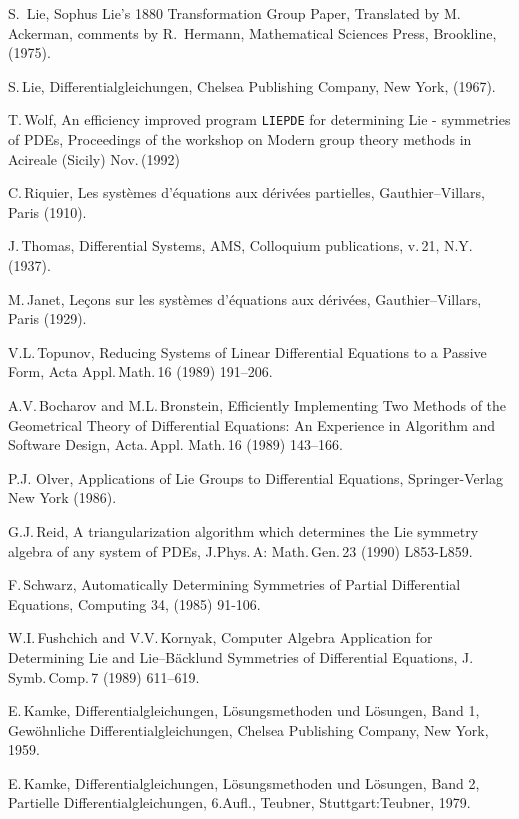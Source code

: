 \begin{thebibliography}{999}
 S.\, Lie, Sophus Lie's 1880 Transformation Group Paper,
Translated by M.\, Ackerman, comments by R.\, Hermann, Mathematical Sciences 
Press, Brookline, (1975).

 S.\,Lie, Differentialgleichungen, Chelsea Publishing Company,
New York, (1967).

 T.\,Wolf, An efficiency improved program \texttt{LIEPDE}
for determining Lie - symmetries of PDEs, Proceedings of the workshop on
Modern group theory methods in Acireale (Sicily) Nov.\,(1992)

 C.\,Riquier, Les syst\`{e}mes d'\'{e}quations 
aux d\'{e}riv\'{e}es partielles, Gauthier--Villars, Paris (1910).

 J.\,Thomas, Differential Systems, AMS, Colloquium
publications, v.\,21, N.Y.\,(1937).

 M.\,Janet, Le\c{c}ons sur les syst\`{e}mes d'\'{e}quations aux
d\'{e}riv\'{e}es, Gauthier--Villars, Paris (1929).

 V.L.\,Topunov, Reducing Systems of Linear Differential
Equations to a Passive Form, Acta Appl.\,Math.\,16 (1989) 191--206.

 A.V.\,Bocharov and M.L.\,Bronstein, Efficiently
Implementing Two Methods of the Geometrical Theory of Differential
Equations: An Experience in Algorithm and Software Design, Acta.\,Appl.
Math.\,16 (1989) 143--166.

 P.J. Olver, Applications of Lie Groups to Differential
Equations, Springer-Verlag New York (1986).

 G.J.\,Reid, A triangularization algorithm which
determines the Lie symmetry algebra of any system of PDEs, J.Phys.\,A:
Math.\,Gen.\,23 (1990) L853-L859.

 F.\,Schwarz, Automatically Determining Symmetries of Partial
Differential Equations, Computing 34, (1985) 91-106.

 W.I.\,Fushchich and V.V.\,Kornyak, Computer Algebra
Application for Determining Lie and Lie--B\"{a}cklund Symmetries of
Differential Equations, J.\,Symb.\,Comp.\,7 (1989) 611--619.

 E.\,Kamke, Differentialgleichungen, L\"{o}sungsmethoden
und L\"{o}sungen, Band 1, Gew\"{o}hnliche Differentialgleichungen,
Chelsea Publishing Company, New York, 1959.

 E.\,Kamke, Differentialgleichungen, L\"{o}sungsmethoden
und L\"{o}sungen, Band 2, Partielle Differentialgleichungen, 6.Aufl.,
Teubner, Stuttgart:Teubner, 1979.


\end{thebibliography}
